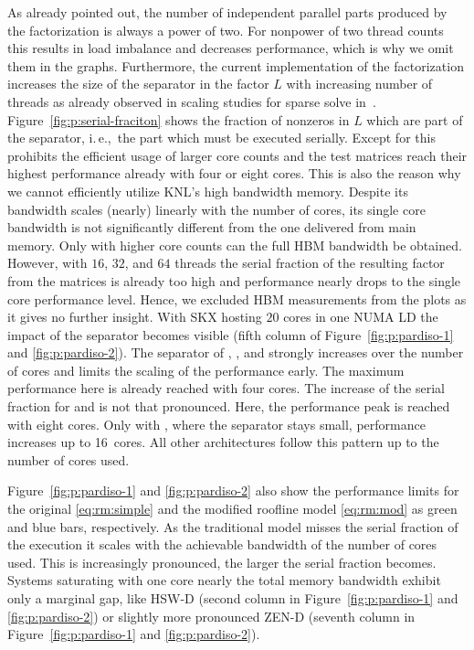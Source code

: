 As already pointed out, the number of independent parallel parts produced by the
factorization is always a power of two.
For nonpower of two thread counts this results in load imbalance and decreases
performance, which is why we omit them in the graphs.
%
Furthermore, the current implementation of the factorization increases the size
of the separator in the factor $L$ with increasing number of threads as already
observed in scaling studies for sparse solve in~\cite{klawonn-2015}.
%
Figure~\ref{fig:p:serial-fraciton} shows the fraction of nonzeros in $L$ which are
part of the separator, i.\,e.,\ the part which must be executed serially.
Except for  this prohibits the efficient usage of larger core
counts and the test matrices reach their highest performance already with four
or eight cores.
%
This is also the reason why we cannot efficiently utilize KNL's high bandwidth
memory.
Despite its bandwidth scales (nearly) linearly with the number of cores, its
single core bandwidth is not significantly different from the one delivered from
main memory.
Only with higher core counts can the full HBM bandwidth be obtained.
However, with $16$, $32$, and $64$ threads the serial fraction of the resulting
factor from the matrices is already too high and performance nearly drops to
the single core performance level.
Hence, we excluded HBM measurements from the plots as it gives no further
insight.
%
With SKX hosting $20$ cores in one NUMA LD the impact of the separator becomes
visible (fifth column of Figure~\ref{fig:p:pardiso-1} and \ref{fig:p:pardiso-2}).
The separator of , , and \/ strongly increases 
over the number of cores and limits the scaling of the performance early.
The maximum performance here is already reached with four cores.
The increase of the serial fraction for  and  is not
that pronounced.
Here, the performance peak is reached with eight cores.
Only with , where the separator stays small, performance increases
up to 16~cores.
All other architectures follow this pattern up to the number of cores used.

Figure~\ref{fig:p:pardiso-1} and \ref{fig:p:pardiso-2} also show the performance limits for the original
\eqref{eq:rm:simple} and the modified roofline model \eqref{eq:rm:mod}
as green and blue bars, respectively.
As the traditional model misses the serial fraction of the execution it scales
with the achievable bandwidth of the number of cores used.
This is increasingly pronounced, the larger the serial fraction becomes. 
%
Systems saturating with one core nearly the total memory bandwidth exhibit
only a marginal gap, like HSW-D (second column in Figure~\ref{fig:p:pardiso-1} and \ref{fig:p:pardiso-2}) or
slightly more pronounced ZEN-D (seventh column in Figure~\ref{fig:p:pardiso-1} and \ref{fig:p:pardiso-2}).


